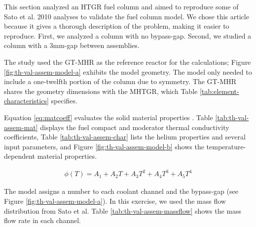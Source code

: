 This section analyzed an HTGR fuel column and aimed to reproduce some of Sato et al. 2010 \cite{sato_computational_2010} analyses to validate the fuel column model.
We chose this article because it gives a thorough description of the problem, making it easier to reproduce.
First, we analyzed a column with no bypass-gap.
Second, we studied a column with a 3mm-gap between assemblies.

The study used the GT-MHR as the reference reactor for the calculations; Figure \ref{fig:th-val-assem-model-a} exhibits the model geometry.
The model only needed to include a one-twelfth portion of the column due to symmetry.
The GT-MHR shares the geometry dimensions with the MHTGR, which Table \ref{tab:element-characteristics} specifies.

Equation \ref{eq:matcoeff} evaluates the solid material properties \cite{johnson_cfd_2009}.
Table \ref{tab:th-val-assem-mat} displays the fuel compact and moderator thermal conductivity coefficients, Table \ref{tab:th-val-assem-char} lists the helium properties and several input parameters, and Figure \ref{fig:th-val-assem-model-b} shows the temperature-dependent material properties.

\begin{align}
  \phi(T) = A_1 + A_2 T + A_3 T^2 + A_4 T^3 + A_5 T^4  \label{eq:matcoeff}
\end{align}

The model assigns a number to each coolant channel and the bypass-gap (see Figure \ref{fig:th-val-assem-model-a}).
In this exercise, we used the mass flow distribution from Sato et al.
Table \ref{tab:th-val-assem-massflow} shows the mass flow rate in each channel.

